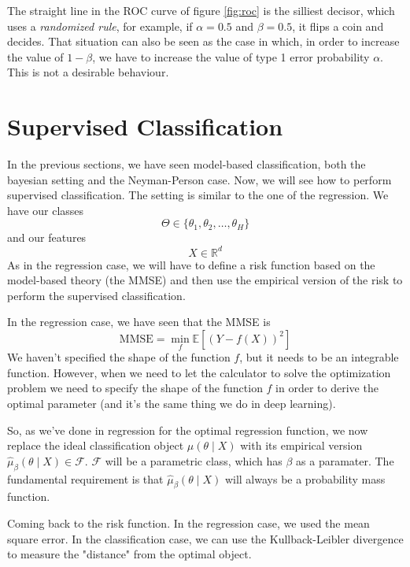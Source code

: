 
The straight line in the ROC curve of figure \ref{fig:roc} is the silliest decisor, which uses a \textit{randomized rule}, for example, if $\alpha=0.5$ and $\beta=0.5$, it flips a coin and decides.
That situation can also be seen as the case in which, in order to increase the value of $1-\beta$, we have to increase the value of type 1 error probability $\alpha$. This is not a desirable behaviour.

\section{Supervised Classification}
In the previous sections, we have seen model-based classification, both the bayesian setting and the Neyman-Person case. Now, we will see how to perform supervised classification. The setting is similar to the one of the regression.
We have our classes
\[
    \Theta \in \{\theta_1, \theta_2, \dots, \theta_H\}
\]
and our features 
\[
    X \in \mathbb{R}^d
\]
As in the regression case, we will have to define a risk function based on the model-based theory (the MMSE) and then use the empirical version of the risk to perform the supervised classification.

In the regression case, we have seen that the MMSE is
\[
    \text{MMSE} = \min_f \mathbb{E}\left[ \left( Y - f(X) \right)^2 \right]
\]
We haven't specified the shape of the function $f$, but it needs to be an integrable function.
However, when we need to let the calculator to solve the optimization problem we need to specify the shape of the function $f$ in order to derive the optimal parameter (and it's the same thing we do in deep learning).

So, as we've done in regression for the optimal regression function, we now replace the ideal classification object $\mu(\theta\mid X)$ with its empirical version $\hat{\mu}_\beta(\theta \mid X) \in \mathcal F$. $\mathcal F$ will be a parametric class, which has $\beta$ as a paramater. 
The fundamental requirement is that $\hat \mu_{\beta}(\theta \mid X)$ will always be a probability mass function.

Coming back to the risk function. In the regression case, we used the mean square error. In the classification case, we can use the Kullback-Leibler divergence to measure the "distance" from the optimal object.

